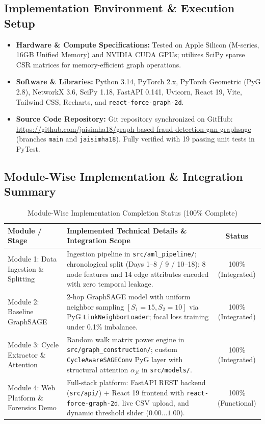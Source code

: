 \documentclass[11pt, a4paper]{article}
\begin{document}
\subsection{Implementation Environment \& Execution Setup}
\begin{itemize}[noitemsep, topsep=2pt]
    \item \textbf{Hardware \& Compute Specifications:} Tested on Apple Silicon (M-series, 16GB Unified Memory) and NVIDIA CUDA GPUs; utilizes SciPy sparse CSR matrices for memory-efficient graph operations.
    \item \textbf{Software \& Libraries:} Python 3.14, PyTorch 2.x, PyTorch Geometric (PyG 2.8), NetworkX 3.6, SciPy 1.18, FastAPI 0.141, Uvicorn, React 19, Vite, Tailwind CSS, Recharts, and \texttt{react-force-graph-2d}.
    \item \textbf{Source Code Repository:} Git repository synchronized on GitHub: \url{https://github.com/jaisimha18/graph-based-fraud-detection-gnn-graphsage} (branches \texttt{main} and \texttt{jaisimha18}). Fully verified with 19 passing unit tests in PyTest.
\end{itemize}

\subsection{Module-Wise Implementation \& Integration Summary}
\begin{table}[H]
    \centering
    \footnotesize
    \renewcommand{\arraystretch}{1.20}
    \begin{tabular}{|p{3.5cm}|p{7.8cm}|c|}
        \hline
        \textbf{Module / Stage} & \textbf{Implemented Technical Details \& Integration Scope} & \textbf{Status} \\
        \hline
        Module 1: Data Ingestion \& Splitting & Ingestion pipeline in \texttt{src/aml\_pipeline/}; chronological split (Days 1--8 / 9 / 10--18); 8 node features and 14 edge attributes encoded with zero temporal leakage. & 100\% (Integrated) \\
        \hline
        Module 2: Baseline GraphSAGE & 2-hop GraphSAGE model with uniform neighbor sampling $[S_1=15, S_2=10]$ via PyG \texttt{LinkNeighborLoader}; focal loss training under 0.1\% imbalance. & 100\% (Integrated) \\
        \hline
        Module 3: Cycle Extractor \& Attention & Random walk matrix power engine in \texttt{src/graph\_construction/}; custom \texttt{CycleAwareSAGEConv} PyG layer with structural attention $\alpha_{ji}$ in \texttt{src/models/}. & 100\% (Integrated) \\
        \hline
        Module 4: Web Platform \& Forensics Demo & Full-stack platform: FastAPI REST backend (\texttt{src/api/}) + React 19 frontend with \texttt{react-force-graph-2d}, live CSV upload, and dynamic threshold slider ($0.00 \dots 1.00$). & 100\% (Functional) \\
        \hline
    \end{tabular}
    \caption{Module-Wise Implementation Completion Status (100\% Complete)}
    \label{tab:module_status}
\end{table}
\end{document}
